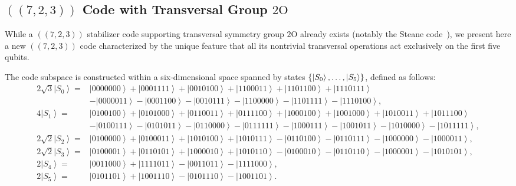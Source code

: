 \documentclass[8pt]{article}
\theoremstyle{definition}
\begin{document}
\subsection{\texorpdfstring{$((7,2,3))$}{((7,2,3))} Code with Transversal Group \texorpdfstring{$2\mathrm{O}$}{2O}}

While a \(((7,2,3))\) stabilizer code supporting transversal symmetry group \(2\mathrm{O}\) already exists (notably the Steane code~\cite{steane1996simple}), we present here a new \(((7,2,3))\) code characterized by the unique feature that all its nontrivial transversal operations act exclusively on the first five qubits.

The code subspace is constructed within a six-dimensional space spanned by states \(\{\ket{S_0}, \ldots, \ket{S_5}\}\), defined as follows:
\begin{align*}
    2\sqrt{3}\left|S_{0}\right\rangle = & \left|0000000\right\rangle +\left|0001111\right\rangle +\left|0010100\right\rangle +\left|1100011\right\rangle +\left|1101100\right\rangle +\left|1110111\right\rangle                                                           \\&-\left|0000011\right\rangle -\left|0001100\right\rangle -\left|0010111\right\rangle -\left|1100000\right\rangle -\left|1101111\right\rangle -\left|1110100\right\rangle ,\\
    4\left|S_{1}\right\rangle =         & \left|0100100\right\rangle +\left|0101000\right\rangle +\left|0110011\right\rangle +\left|0111100\right\rangle +\left|1000100\right\rangle +\left|1001000\right\rangle +\left|1010011\right\rangle +\left|1011100\right\rangle   \\&-\left|0100111\right\rangle -\left|0101011\right\rangle -\left|0110000\right\rangle -\left|0111111\right\rangle -\left|1000111\right\rangle -\left|1001011\right\rangle -\left|1010000\right\rangle -\left|1011111\right\rangle, \\
    2\sqrt{2}\left|S_{2}\right\rangle = & \left|0100000\right\rangle +\left|0100011\right\rangle +\left|1010100\right\rangle +\left|1010111\right\rangle -\left|0110100\right\rangle -\left|0110111\right\rangle -\left|1000000\right\rangle -\left|1000011\right\rangle , \\
    2\sqrt{2}\left|S_{3}\right\rangle = & \left|0100001\right\rangle +\left|0110101\right\rangle +\left|1000010\right\rangle +\left|1010110\right\rangle -\left|0100010\right\rangle -\left|0110110\right\rangle -\left|1000001\right\rangle -\left|1010101\right\rangle , \\
    2\left|S_{4}\right\rangle =         & \left|0011000\right\rangle +\left|1111011\right\rangle -\left|0011011\right\rangle -\left|1111000\right\rangle ,                                                                                                                 \\
    2\left|S_{5}\right\rangle =         & \left|0101101\right\rangle +\left|1001110\right\rangle -\left|0101110\right\rangle -\left|1001101\right\rangle .
\end{align*}
\end{document}
